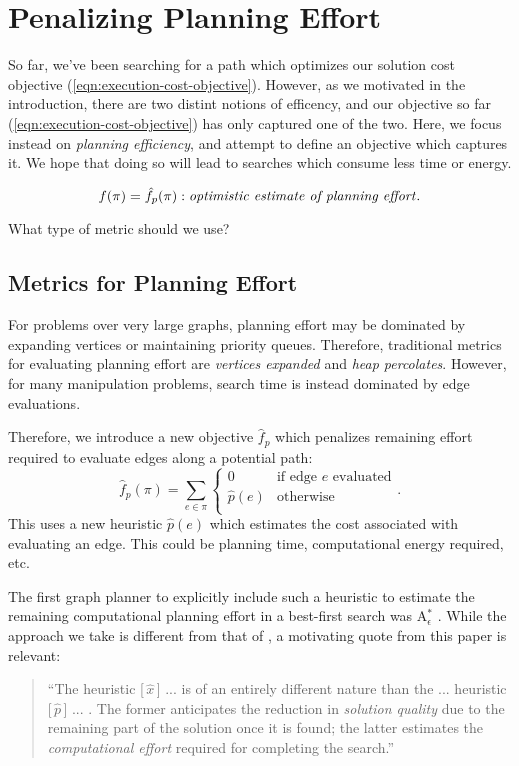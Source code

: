 \section{Penalizing Planning Effort}

So far, we've been searching for a path which optimizes our solution
cost objective (\ref{eqn:execution-cost-objective}).
However, as we motivated in the introduction,
there are two distint notions of efficency,
and our objective so far (\ref{eqn:execution-cost-objective})
has only captured one of the two.
Here, we focus instead on \emph{planning efficiency},
and attempt to define an objective which captures it.
We hope that doing so will lead to searches which consume less 
time or energy.

\begin{equation}
   f(\pi) = \hat{f}_p(\pi) : \mbox{\emph{optimistic estimate of planning effort}}.
\end{equation}

What type of metric should we use?

\subsection{Metrics for Planning Effort}

For problems over very large graphs,
planning effort may be dominated by expanding vertices
or maintaining priority queues.
Therefore, traditional metrics for evaluating planning
effort are \emph{vertices expanded}
and \emph{heap percolates}.
However, for many manipulation problems,
search time is instead dominated by edge evaluations.

Therefore, we introduce a new objective $\hat{f}_p$
which penalizes remaining effort required to evaluate edges
along a potential path:
\begin{equation}
   \hat{f}_p(\pi) = \sum_{e \in \pi} \left\{
   \begin{array}{cl}
      0 & \mbox{if edge } e \mbox{ evaluated}  \\
      \hat{p}(e) & \mbox{otherwise} \\
   \end{array}
   \right.
   .
\end{equation}
This uses a new heuristic $\hat{p}(e)$ which estimates the cost
associated with evaluating an edge.
This could be planning time, computational energy required, etc.

The first graph planner to explicitly include such a heuristic
to estimate the remaining
computational planning effort in a best-first search
was A$_\epsilon^*$ \cite{pearl1982semiadmissible}.
While the approach we take is different from that of
\cite{pearl1982semiadmissible},
a motivating quote from this paper is relevant:
\begin{quote}
``The heuristic [\,$\hat{x}$\,] ... is of an entirely
different nature than the ... heuristic [\,$\hat{p}$\,] ... .
The former anticipates the reduction in \emph{solution quality} due to the
remaining part of the solution once it is found;
the latter estimates the \emph{computational effort}
required for completing the search.''
\end{quote}

